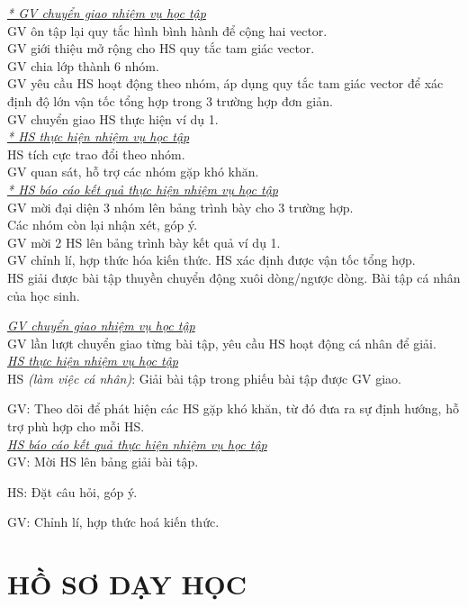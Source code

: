 {\textit{\underline{* GV chuyển giao nhiệm vụ học tập}}\\
	GV ôn tập lại quy tắc hình bình hành để cộng hai vector.\\
	GV giới thiệu mở rộng cho HS quy tắc tam giác vector.\\
	GV chia lớp thành 6 nhóm.\\
	GV yêu cầu HS hoạt động theo nhóm, áp dụng quy tắc tam giác vector để xác định độ lớn vận tốc tổng hợp trong 3 trường hợp đơn giản.\\
	GV chuyển giao HS thực hiện ví dụ 1.\\
	\textit{\underline{* HS thực hiện nhiệm vụ học tập}}\\
	HS tích cực trao đổi theo nhóm.\\
	GV quan sát, hỗ trợ các nhóm gặp khó khăn.\\
	\textit{\underline{* HS báo cáo kết quả thực hiện nhiệm vụ học tập}}\\
	GV mời đại diện 3 nhóm lên bảng trình bày cho 3 trường hợp.\\
	Các nhóm còn lại nhận xét, góp ý.
	\\
	GV mời 2 HS lên bảng trình bày kết quả ví dụ 1.
	\\
	GV chỉnh lí, hợp thức hóa kiến thức.
}
{
	HS xác định được vận tốc tổng hợp.\\
	HS giải được bài tập thuyền chuyển động xuôi dòng/ngược dòng.
}
{
	Bài tập cá nhân của học sinh.
}
{
	\textit{\underline{GV chuyển giao nhiệm vụ học tập}}\\
	GV lần lượt chuyển giao từng bài tập, yêu cầu HS hoạt động cá nhân để giải.\\
	\textit{\underline{HS thực hiện nhiệm vụ học tập}}\\
	HS \textit{(làm việc cá nhân)}:  Giải bài tập trong phiếu bài tập được GV giao. 
	
	GV: Theo dõi để phát hiện các HS gặp khó khăn, từ đó đưa ra sự định hướng, hỗ trợ phù hợp cho mỗi HS.\\
	\textit{\underline{HS báo cáo kết quả thực hiện nhiệm vụ học tập}}\\
	GV: Mời HS lên bảng giải bài tập.
	
	HS: Đặt câu hỏi, góp ý.
	
	GV: Chỉnh lí, hợp thức hoá kiến thức.
}
\section{HỒ SƠ DẠY HỌC}
